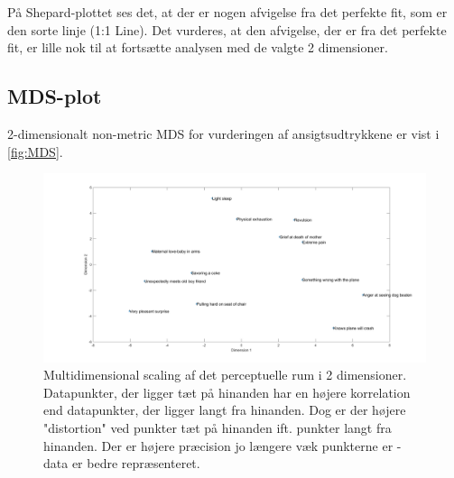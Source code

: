 \noindent På Shepard-plottet ses det, at der er nogen afvigelse fra det perfekte fit, som er den sorte linje (1:1 Line). Det vurderes, at den afvigelse, der er fra det perfekte fit, er lille nok til at fortsætte analysen med de valgte 2 dimensioner. 

\subsection*{MDS-plot}
2-dimensionalt non-metric MDS for vurderingen af ansigtsudtrykkene er vist i \autoref{fig:MDS}.  
%
\begin{figure}[H]
\centering
\includegraphics[width =\textwidth]{Figure/MDS_plot} 
\caption{Multidimensional scaling af det perceptuelle rum i 2 dimensioner. Datapunkter, der ligger tæt på hinanden har en højere korrelation end datapunkter, der ligger langt fra hinanden. Dog er der højere "distortion" ved punkter tæt på hinanden ift. punkter langt fra hinanden. Der er højere præcision jo længere væk punkterne er - data er bedre repræsenteret.}
\label{fig:MDS}
\end{figure}
%

